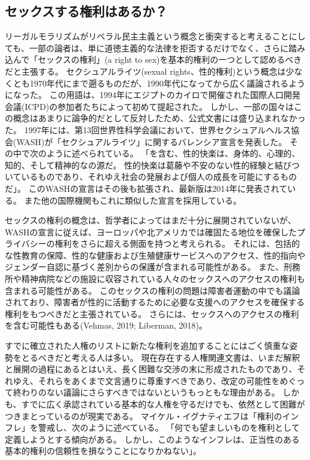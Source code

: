 \documentclass[paper=a4,book,openany]{jlreq}
\begin{document}
\subsection{セックスする権利はあるか？}

リーガルモラリズムがリベラル民主主義という概念と衝突すると考えることにしても、一部の論者は、単に道徳主義的な法律を拒否するだけでなく、さらに踏み込んで「セックスの権利」(a right to sex)を基本的権利の一つとして認めるべきだと主張する。
セクシュアルライツ(sexual rights、性的権利)という概念は少なくとも1970年代にまで遡るものだが、1990年代になってから広く議論されるようになった。
この用語は、1994年にエジプトのカイロで開催された国際人口開発会議(ICPD)の参加者たちによって初めて提起された。
しかし、一部の国々はこの概念はあまりに論争的だとして反対したため、公式文書には盛り込まれなかった\citep{correa07:_global_persp_sexual_right}。
1997年には、第13回世界性科学会議において、世界セクシュアルヘルス協会(WASH)が「セクシュアルライツ」に関するバレンシア宣言を発表した。
その中で次のように述べられている。
「を含む、性的快楽は、身体的、心理的、知的、そして精神的なの源だ。
性的快楽は葛藤や不安のない性的経験と結びついているものであり、それゆえ社会の発展および個人の成長を可能にするものだ」\citep{WASH97:_valen_declar_sexual_right}。
このWASHの宣言はその後も拡張され、最新版は2014年に発表されている。
また他の国際機関もこれに類似した宣言を採用している。

セックスの権利の概念は、哲学者によってはまだ十分に展開されていないが、WASHの宣言に従えば、ヨーロッパや北アメリカでは確固たる地位を確保したプライバシーの権利をさらに超える側面を持つと考えられる。
それには、包括的な性教育の保障、性的な健康および生殖健康サービスへのアクセス、性的指向やジェンダー自認に基づく差別からの保護が含まれる可能性がある。
また、刑務所や精神病院などの施設に収容されている人々のセックスへのアクセスの権利も含まれる可能性がある。
このセックスの権利の問題は障害者運動の中でも議論されており、障害者が性的に活動するために必要な支援へのアクセスを確保する権利をもつべきだと主張されている。
さらには、セックスへのアクセスの権利を含む可能性もある(Vehmas, 2019; Liberman, 2018)。
\nocite{vehmas19:_person_profoun_intel_disab_their_right_sex}\nocite{liberman18:_disab_sex_right_scope_sexual_exclus}

すでに確立された人権のリストに新たな権利を追加することにはごく慎重な姿勢をとるべきだと考える人は多い。
現在存在する人権関連文書は、いまだ解釈と展開の過程にあるとはいえ、長く困難な交渉の末に形成されたものであり、それゆえ、それらをあくまで文言通りに尊重すべきであり、改定の可能性をめぐって終わりのない議論にさらすべきではないというもっともな理由がある。
しかも、すでに広く承認されている基本的な人権を守るだけでも、依然として困難がつきまとっているのが現実である。
マイケル・イグナティエフは「権利のインフレ」を警戒し、次のように述べている。
「何でも望ましいものを権利として定義しようとする傾向がある。
しかし、このようなインフレは、正当性のある基本的権利の信頼性を損なうことになりかねない」\citep[p.90]{ignatieff03:_human_right_polit_idolat}。
\end{document}
